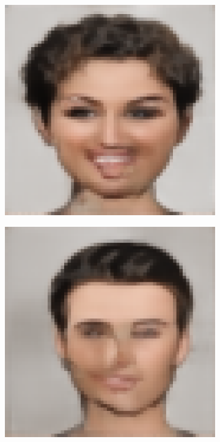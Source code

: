 \documentclass{IEEEcsmag}
\begin{document}
\begin{figure}[ht]
    \smallskip
    \setcounter{subfigure}{0}  %

    \begin{subfigure}{0.12\textwidth}
        \includegraphics[width=\linewidth]{Prompted/generated_images/image4.webp_CVAE.png}
    \end{subfigure}
    \begin{subfigure}{0.12\textwidth}
        \includegraphics[width=\linewidth]{Digital sketches/generated_images/image16.jpeg_CVAE.png}

\end{subfigure}
\end{figure}
\end{document}
